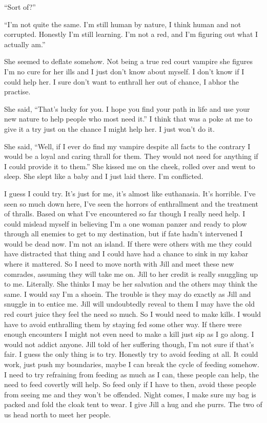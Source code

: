 ``Sort of?''

``I'm not quite the same. I'm still human by nature, I think human and not corrupted. Honestly I'm still learning. I'm not a red, and I'm figuring out what I actually am.''

She seemed to deflate somehow. Not being a true red court vampire she figures I'm no cure for her ills and I just don't know about myself. I don't know if I could help her. I sure don't want to enthrall her out of chance, I abhor the practise.

She said, ``That's lucky for you. I hope you find your path in life and use your new nature to help people who most need it.'' I think that was a poke at me to give it a try just on the chance I might help her. I just won't do it.

She said, ``Well, if I ever do find my vampire despite all facts to the contrary I would be a loyal and caring thrall for them. They would not need for anything if I could provide it to them.'' She kissed me on the cheek, rolled over and went to sleep. She slept like a baby and I just laid there. I'm conflicted.

I guess I could try. It's just for me, it's almost like euthanasia. It's horrible. I've seen so much down here, I've seen the horrors of enthrallment and the treatment of thralls. 
Based on what I've encountered so far though I really need help. I could mislead myself in believing I'm a one woman panzer and ready to plow through all enemies to get to my destination, but if fate hadn't intervened I would be dead now. I'm not an island. If there were others with me they could have distracted that thing and I could have had a chance to sink in my kabar where it mattered.
So I need to move north with Jill and meet these new comrades, assuming they will take me on.
Jill to her credit is really snuggling up to me. Literally. She thinks I may be her salvation and the others may think the same. I would say I'm a shoein.
The trouble is they may do exactly as Jill and snuggle in to entice me. Jill will undoubtedly reveal to them I may have the old red court juice they feel the need so much.
So I would need to make kills. I would have to avoid enthralling them by staying fed some other way. If there were enough encounters I might not even need to make a kill just sip as I go along. I would not addict anyone.
Jill told of her suffering though, I'm not sure if that's fair.
I guess the only thing is to try. Honestly try to avoid feeding at all. It could work, just push my boundaries, maybe I can break the cycle of feeding somehow.
I need to try refraining from feeding as much as I can, these people can help, the need to feed covertly will help.
So feed only if I have to then, avoid these people from seeing me and they won't be offended.
Night comes, I make sure my bag is packed and fold the cloak tent to wear. I give Jill a hug and she purrs. The two of us head north to meet her people.



 


 
 
 
 
 
 